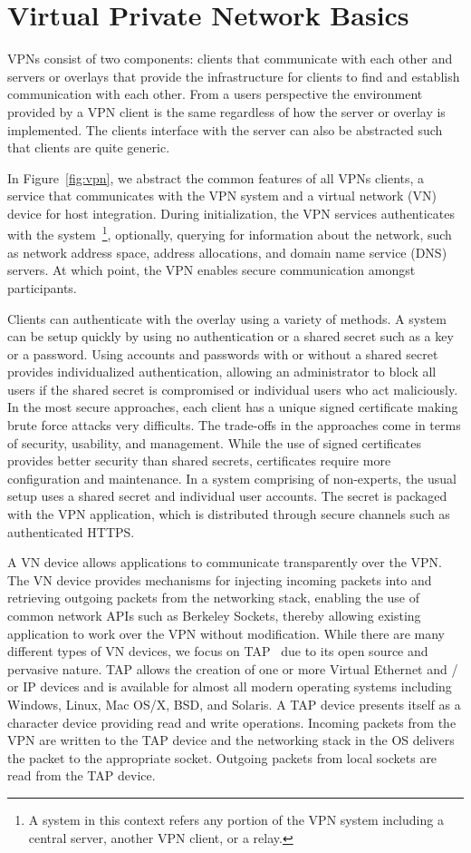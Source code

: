 \section{Virtual Private Network Basics}
VPNs consist of two components: clients that communicate with each other and
servers or overlays that provide the infrastructure for clients to find and
establish communication with each other.  From a users perspective the
environment provided by a VPN client is the same regardless of how the server
or overlay is implemented.  The clients interface with the server can also
be abstracted such that clients are quite generic.

In Figure~\ref{fig:vpn}, we abstract the common features of all VPNs clients, a
service that communicates with the VPN system and a virtual network (VN) device
for host integration.  During initialization, the VPN services authenticates
with the system~\footnote{A system in this context refers any portion of the
VPN system including a central server, another VPN client, or a relay.},
optionally, querying for information about the network, such as network address
space, address allocations, and domain name service (DNS) servers.  At which
point, the VPN enables secure communication amongst participants.

Clients can authenticate with the overlay using a variety of methods.  A system
can be setup quickly by using no authentication or a shared secret such as a key
or a password.  Using accounts and passwords with or without a shared secret
provides individualized authentication, allowing an administrator to block all
users if the shared secret is compromised or individual users who act
maliciously.  In the most secure approaches, each client has a unique signed
certificate making brute force attacks very difficults.  The trade-offs in the
approaches come in terms of security, usability, and management.  While the use
of signed certificates provides better security than shared secrets,
certificates require more configuration and maintenance.  In a system comprising
of non-experts, the usual setup uses a shared secret and individual user
accounts.  The secret is packaged with the VPN application, which is distributed
through secure channels such as authenticated HTTPS.

A VN device allows applications to communicate transparently over the VPN.  The
VN device provides mechanisms for injecting incoming packets into and retrieving
outgoing packets from the networking stack, enabling the use of common network
APIs such as Berkeley Sockets, thereby allowing existing application to work over
the VPN without modification.  While there are many different types of VN
devices, we focus on TAP~\cite{tap} due to its open source and pervasive nature.
TAP allows the creation of one or more Virtual Ethernet and / or IP devices and
is available for almost all modern operating systems including Windows, Linux,
Mac OS/X, BSD, and Solaris.  A TAP device presents itself as a character device
providing read and write operations.  Incoming packets from the VPN are written
to the TAP device and the networking stack in the OS delivers the packet to the
appropriate socket.  Outgoing packets from local sockets are read from the TAP
device.

